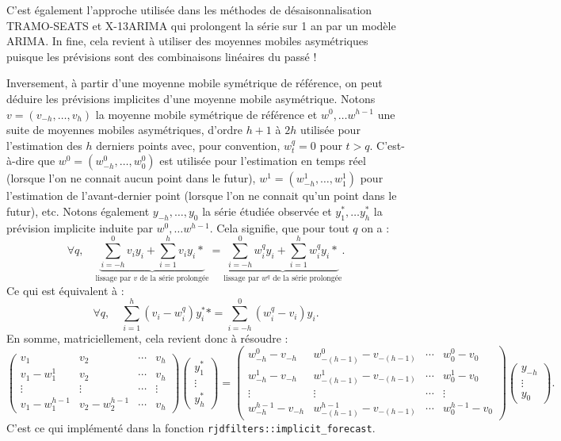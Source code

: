 \documentclass[
  12pt,
  french,
  12pt,a4paper]{article}
\newcommand\1{\mathds{1}}
\begin{document}
C'est également l'approche utilisée dans les méthodes de désaisonnalisation TRAMO-SEATS et X-13ARIMA qui prolongent la série sur 1 an par un modèle ARIMA.
In fine, cela revient à utiliser des moyennes mobiles asymétriques puisque les prévisions sont des combinaisons linéaires du passé !

Inversement, à partir d'une moyenne mobile symétrique de référence, on peut déduire les prévisions implicites d'une moyenne mobile asymétrique.
Notons \(v=(v_{-h},\dots, v_{h})\) la moyenne mobile symétrique de référence et \(w^0,\dots w^{h-1}\) une suite de moyennes mobiles asymétriques, d'ordre \(h+1\) à \(2h\) utilisée pour l'estimation des \(h\) derniers points avec, pour convention, \(w_t^q=0\) pour \(t>q\).
C'est-à-dire que \(w^0=(w_{-h}^0,\dots, w_{0}^0)\) est utilisée pour l'estimation en temps réel (lorsque l'on ne connait aucun point dans le futur), \(w^1=(w_{-h}^1,\dots, w_{1}^1)\) pour l'estimation de l'avant-dernier point (lorsque l'on ne connait qu'un point dans le futur), etc.
Notons également \(y_{-h},\dots,y_{0}\) la série étudiée observée et \(y_{1}^*,\dots y_h^*\) la prévision implicite induite par \(w^0,\dots w^{h-1}\).
Cela signifie, que pour tout \(q\) on a :
\[
\forall q, \quad \underbrace{\sum_{i=-h}^0 v_iy_i + \sum_{i=1}^h v_iy_i*}_{\text{lissage par }v\text{ de la série prolongée}}
=\underbrace{\sum_{i=-h}^0 w_i^qy_i + \sum_{i=1}^h w_i^qy_i*}_{\text{lissage par }w^q\text{ de la série prolongée}}.
\]
Ce qui est équivalent à :
\[
\forall q, \quad \sum_{i=1}^h (v_i- w_i^q) y_i^**
=\sum_{i=-h}^0 (w_i^q-v_i)y_i.
\]
En somme, matriciellement, cela revient donc à résoudre :
\[\scriptstyle
\begin{pmatrix}
  v_1 & v_2 & \cdots & v_h \\
  v_1 - w_1^1 & v_2 & \cdots & v_h \\
  \vdots & \vdots & \cdots & \vdots \\
   v_1 - w_1^{h-1} & v_2-w_2^{h-1} & \cdots & v_h
\end{pmatrix}
\begin{pmatrix}y_1^* \\ \vdots \\ y_h^*\end{pmatrix}=
\begin{pmatrix}
  w_{-h}^0 - v_{-h} & w_{-(h-1)}^0 - v_{-(h-1)} & \cdots & w_{0}^0 - v_{0} \\
  w_{-h}^1 - v_{-h} & w_{-(h-1)}^1 - v_{-(h-1)} & \cdots & w_{0}^1 - v_{0} \\
  \vdots & \vdots & \cdots & \vdots \\
  w_{-h}^{h-1} - v_{-h} & w_{-(h-1)}^{h-1} - v_{-(h-1)} & \cdots & w_{0}^{h-1} - v_{0}
\end{pmatrix}
\begin{pmatrix}y_{-h} \\ \vdots \\ y_0\end{pmatrix}.\]
C'est ce qui implémenté dans la fonction \texttt{rjdfilters::implicit\_forecast}.
\end{document}
